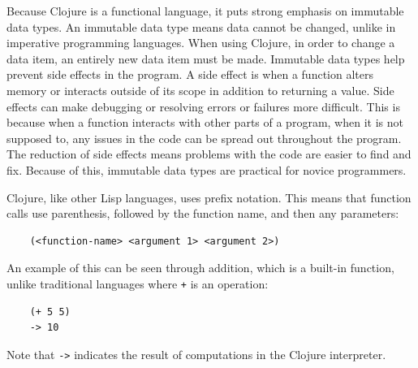 \documentclass[12pt]{article}
\newcommand{\comment}[1]{{\bf \tt  {#1}}}
\newcommand{\emcomment}[1]{\textcolor{ForestGreen}{\comment{Elena: {#1}}}}
\newcommand{\hfcomment}[1]{\textcolor{Teal}{\comment{Henry: {#1}}}}
\begin{document}
Because Clojure is a functional language, it puts strong emphasis on
immutable data types. An immutable data type means data cannot 
be changed, unlike in %
imperative programming languages. When using Clojure, in order to change a data item, an entirely 
new data item must be made. Immutable data types help prevent side effects in the program. 
A side effect is when a function alters memory or interacts outside of its scope in addition to 
returning a value. Side effects can make debugging or resolving errors or failures more
difficult. This is because when a function interacts with other parts of a program,
when it is not supposed to, any issues in the code can be spread out throughout the program. The
reduction of side effects means problems with the code are easier to find and fix.
Because of this, immutable data types are practical for novice programmers.

Clojure, like other Lisp languages, uses prefix notation. This means
that function calls use parenthesis, followed by the function name,
and then any parameters: 
\begin{verbatim}
	(<function-name> <argument 1> <argument 2>)
\end{verbatim}

An example of this can be seen through addition, which is a built-in function, unlike traditional
languages where \texttt{+} is an operation: %

\begin{verbatim}
	(+ 5 5)
	-> 10
\end{verbatim}

Note that \texttt{->} indicates the result of computations in the Clojure interpreter.
\end{document}
